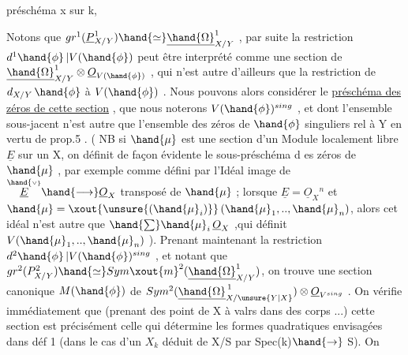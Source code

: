 
préschéma x sur k, 

Notons que $gr^1(\underline{P}^1_{X/Y}) \hand{\simeq} \underline{\hand{\Omega}}^1_{X/Y}$ , par suite la restriction
$d^1\hand{\phi}\,|V(\hand{\phi})$ peut être interprété comme une section de $\underline{\hand{\Omega}}^1_{X/Y} \otimes \underline{O}_{V(\hand{\phi})}$ ,
qui n'est autre d'ailleurs que la restriction de $d_{X/Y}\,\hand{\phi}$ à $V(\hand{\phi})$ . Nous
pouvons alors considérer le \uline{préschéma des zéros de cette section} , que
nous noterons $V(\hand{\phi})^{sing}$ , et dont l'ensemble sous-jacent n'est autre
que l'ensemble des zéros de $\hand{\phi}$ singuliers rel à Y en vertu de prop.5 .
( NB si \xout{\unsure{$\hand{\phi}$}} $\hand{\mu}$ est une section d'un Module localement libre  $\underline{E}$ sur un
\margin{$\|$}  X, on définit de façon évidente le sous-préschéma d es
zéros de $\hand{\mu}$ , par exemple comme défini par l'Idéal image de $\overset{\hand{\scriptscriptstyle\vee}}{\underline{E}} \hand{\longrightarrow} \underline{O}_X$
transposé de $\hand{\mu}$ ; lorsque $\underline{E} = \underline{O}_X{}^n$ et $\hand{\mu} = \xout{\unsure{(\hand{\mu}_i)}}\,(\hand{\mu}_1,..,\hand{\mu}_n)$, alors cet
idéal n'est autre que $\hand{\sum} \hand{\mu}_i\,\underline{O}_X$ ,qui définit $V(\hand{\mu}_1,..,\hand{\mu}_n)$ ). Prenant
maintenant la restriction $d^2\hand{\phi}\,|V(\hand{\phi})^{sing}$ , et notant que
$gr^2(P^2_{X/Y}) \hand{\simeq} Sym\xout{m}^2(\underline{\hand{\Omega}}^1_{X/Y})$, on trouve une section canonique $M(\hand{\phi})$ de
$Sym^2(\underline{\hand{\Omega}}^{\,1}_{X/\unsure{Y|X}}) \otimes \underline{O}_{V^{sing}}$ . On vérifie immédiatement que (prenant des
\margin{$\|$}point de X à valrs dans des corps ...) cette section est précisément
celle qui détermine les formes quadratiques envisagées dans déf 1
(dans le cas  d'un $X_k$ déduit de X/S par Spec(k)$\hand{\rightarrow}$ S). On
